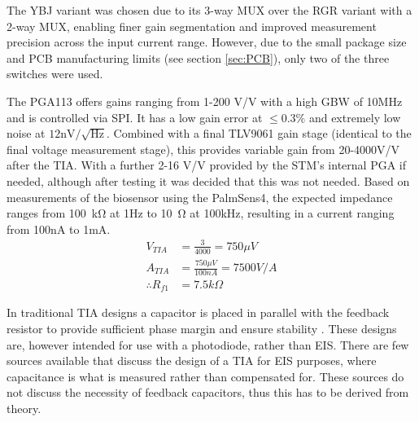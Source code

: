 The YBJ variant was chosen due to its 3-way \ac{MUX} over the RGR variant with a 2-way \ac{MUX}, enabling finer gain segmentation and improved measurement precision across the input current range. However, due to the small package size and PCB manufacturing limits (see section \ref{sec:PCB}), only two of the three switches were used.

The PGA113 offers gains ranging from 1-200 V/V with a high GBW of 10MHz and is controlled via SPI. It has a low gain error at $\le0.3\%$ and extremely low noise at $12\text{nV}/\sqrt{\text{Hz}}$. Combined with a final TLV9061 gain stage (identical to the final voltage measurement stage), this provides variable gain from 20-4000V/V after the TIA. With a further 2-16 V/V provided by the STM's internal PGA if needed, although after testing it was decided that this was not needed. Based on measurements of the biosensor using the PalmSens4, the expected impedance ranges from \SI{100}{\kilo\ohm} at 1Hz to \SI{10}{\ohm} at 100kHz, resulting in a current ranging from 100nA to 1mA. 
\begin{align}
        V_{TIA} &= \frac{3}{4000} = 750 \mu  V \label{eq:tia_1}\\
        A_{TIA} &= \frac{750 \mu V}{100 nA} = 7500 V/A \\
        \therefore  R_{f1} &= 7.5 k\Omega \label{eq:tia_3}
\end{align}


In traditional TIA designs a capacitor is placed in parallel with the feedback resistor to provide sufficient phase margin and ensure stability \cite{StabilizeYourTransimpedance}. These designs are, however intended for use with a photodiode, rather than \ac{EIS}. There are few sources available that discuss the design of a TIA for EIS purposes, where capacitance is what is measured rather than compensated for. These sources do not discuss the necessity of feedback capacitors, thus this has to be derived from theory.

